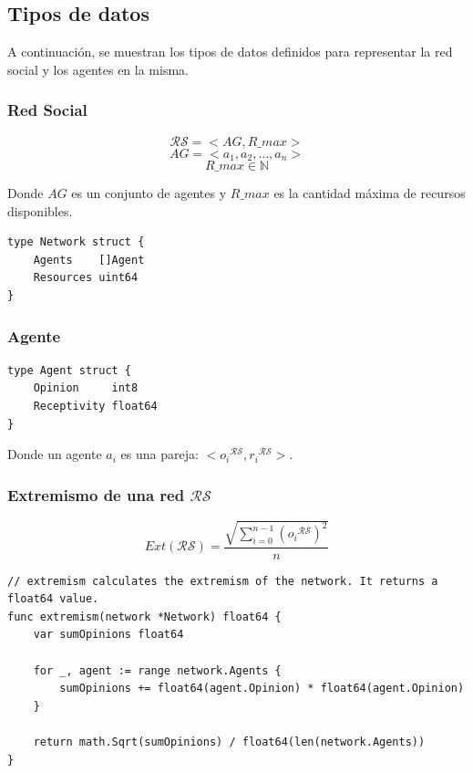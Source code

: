 \documentclass[letterpaper,10pt]{article}
\begin{document}
\subsection*{Tipos de datos}
A continuación, se muestran los tipos de datos definidos para representar la red social y los agentes en la misma.
\subsubsection*{Red Social}
\begin{equation}
  \mathcal{R} \mathcal{S} = < AG, R\_max >
\end{equation}\label{eq:red_social}
\begin{equation}
  AG = < a_1, a_2, \ldots, a_n >
  \label{eq:agentes}
\end{equation}
\begin{equation}
  R\_max \in \mathbb{N}
  \label{eq:recursos}
\end{equation}

Donde $AG$ es un conjunto de agentes y $R\_max$ es la cantidad máxima de recursos disponibles.

\begin{lstlisting}[caption={Definición de red social}, label={lst:r_s}]
type Network struct {
    Agents    []Agent
    Resources uint64
}
\end{lstlisting}
\subsubsection*{Agente}

\begin{lstlisting}[caption={Definición de agente}, label={lst:agente}]
type Agent struct {
    Opinion     int8
    Receptivity float64
}
\end{lstlisting}
Donde un agente $a_i$ es una pareja: $<{o_i}{^{\mathcal{R} \mathcal{S}}}, {r_i}{^{\mathcal{R} \mathcal{S}}}>$.

\subsubsection*{Extremismo de una red $\mathcal{R}\mathcal{S}$}
\begin{equation}
  Ext(\mathcal{R}\mathcal{S}) = \frac{\sqrt{\sum_{i=0}^{n-1}{({o_i}{^{\mathcal{R} \mathcal{S}}})^2}}}{n}
  \label{eq:extremismo}
\end{equation}

\begin{lstlisting}[caption={Implementación del extremismo}, label={lst:ext}]
// extremism calculates the extremism of the network. It returns a float64 value.
func extremism(network *Network) float64 {
	var sumOpinions float64

	for _, agent := range network.Agents {
		sumOpinions += float64(agent.Opinion) * float64(agent.Opinion)
	}

	return math.Sqrt(sumOpinions) / float64(len(network.Agents))
}
\end{lstlisting}
\end{document}
